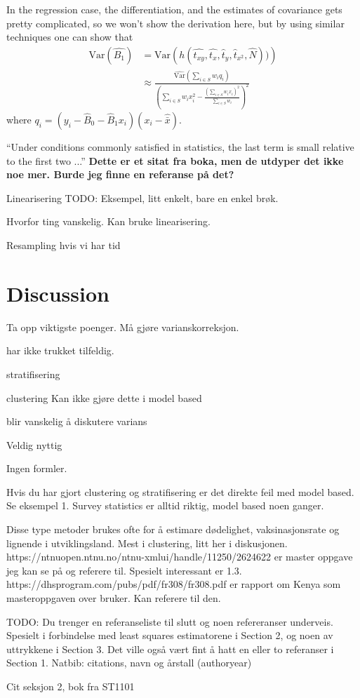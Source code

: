 \documentclass{article}
\begin{document}
In the regression case, the differentiation, and the estimates of covariance
gets pretty complicated, so we won't show the derivation here, but by using
similar techniques one can show that
\begin{align*}
 \mathrm{Var}(\hat{B_1})
 &= \mathrm{Var} \left( h(\hat{t_{xy}}, \hat{t_x},
 \hat{t}_y, \hat{t}_{x^2}, \hat{N})) \right) \\
 &\approx \frac{\widehat{\mathrm{Var}}\left( \sum_{i \in S} w_i q_i \right)}
   {\left( \sum_{i \in S} w_i x_i^2 - \frac{\left( \sum_{i \in S} w_i x_i \right)^2}{\sum_{i \in S} w_i} \right)^2}
\end{align*}
where \(q_i = (y_i - \hat{B}_0 - \hat{B}_1 x_i)(x_i - \hat{\bar{x}})\).

``Under conditions commonly satisfied in statistics, the last term is small
relative to the first two ...'' \textbf{Dette er et sitat fra boka, men de
  utdyper det ikke noe mer. Burde jeg finne en referanse på det?}


Linearisering
TODO: Eksempel, litt enkelt, bare en enkel brøk.

Hvorfor ting vanskelig.
Kan bruke linearisering.

Resampling hvis vi har tid

\section{Discussion}
Ta opp viktigste poenger.
Må gjøre varianskorreksjon.

har ikke trukket tilfeldig.

stratifisering

clustering
  Kan ikke gjøre dette i model based

blir vanskelig å diskutere varians

Veldig nyttig

Ingen formler.

Hvis du har gjort clustering og stratifisering er det direkte feil med model
based. Se eksempel 1. Survey statistics er alltid riktig, model based noen ganger.

Disse type metoder brukes ofte for å estimare dødelighet, vaksinasjonsrate og
lignende i utviklingsland. Mest i clustering, litt her i diskusjonen.
https://ntnuopen.ntnu.no/ntnu-xmlui/handle/11250/2624622 er master oppgave jeg
kan se på og referere til. Spesielt interessant er 1.3.
https://dhsprogram.com/pubs/pdf/fr308/fr308.pdf er rapport om Kenya som
masteroppgaven over bruker. Kan referere til den.

TODO: Du trenger en referanseliste til slutt og noen refereranser underveis. Spesielt i forbindelse med least squares estimatorene i Section 2, og noen av uttrykkene i Section 3. Det ville også vært fint å hatt en eller to referanser i Section 1.
Natbib: citations, navn og årstall (authoryear)

Cit seksjon 2, bok fra ST1101
\end{document}
